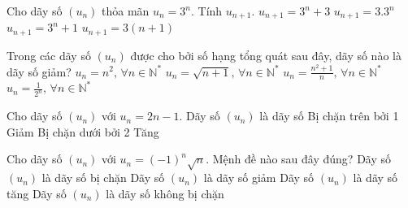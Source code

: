 \begin{ex}%
	Cho dãy số $\left(u_{n} \right)$ thỏa mãn $u_{n} =3^{n}$. Tính $u_{n+1}$.
	\choice
	{$u_{n+1} =3^{n} +3$}
	{$u_{n+1} =3.3^{n}$}
	{$u_{n+1} =3^{n} +1$}
	{\True $u_{n+1} =3\left(n+1\right)$}
\end{ex}

\begin{ex}%
	Trong các dãy số $\left(u_{n} \right)$ được cho bởi số hạng tổng quát sau đây, dãy số nào là dãy số giảm?
	\choice
	{$u_{n} =n^{2} ,\, \forall n\in \mathbb{N}^{*} $}
	{$u_{n} =\sqrt{n+1} ,\, \forall n\in \mathbb{N}^{*} $}
	{$u_{n} =\frac{n^{2} +1}{n} ,\, \forall n\in \mathbb{N}^{*}$}
	{\True $u_{n} =\frac{1}{2^{n} } ,\, \forall n\in \mathbb{N}^{*}$}
\end{ex}

\begin{ex}%
	Cho dãy số $\left(u_{n} \right)$ với $u_{n} =2n-1$. Dãy số $\left(u_{n} \right)$ là dãy số
	\choice
	{Bị chặn trên bởi 1}
	{Giảm}
	{Bị chặn dưới bởi 2}
	{\True Tăng}
\end{ex}

\begin{ex}%
	Cho dãy số $\left(u_{n} \right)$ với $u_{n} =\left(-1\right)^{n} \sqrt{n} $. Mệnh đề nào sau đây đúng?
	\choice
	{Dãy số $\left(u_{n} \right)$ là dãy số bị chặn}
	{Dãy số $\left(u_{n} \right)$ là dãy số giảm}
	{Dãy số $\left(u_{n} \right)$ là dãy số tăng}
	{\True Dãy số $\left(u_{n} \right)$ là dãy số không bị chặn}
\end{ex}


